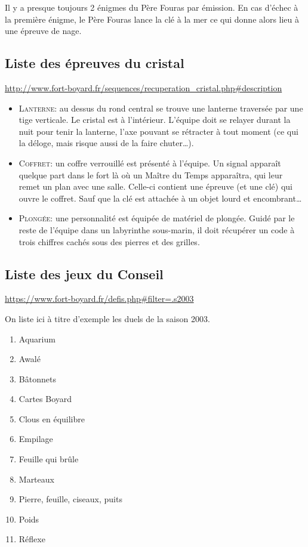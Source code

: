 \documentclass[french,twocolumn,twoside]{article}
\newcommand\bulb{{\faLightbulbO}\xspace}
\newcommand\fist{{\faHandRockO}\xspace}
\newcommand\cristal{{\faDiamond}\xspace}
\begin{document}
Il y a presque toujours 2 énigmes du Père Fouras par émission. En cas d'échec à la première énigme, le Père Fouras lance la clé à la mer ce qui donne alors lieu à une épreuve de nage.

\subsection*{Liste des épreuves du cristal \cristal}

\url{http://www.fort-boyard.fr/sequences/recuperation_cristal.php#description}

\begin{itemize}
	\item \lettrine{L}{anterne}: au dessus du rond central se trouve une lanterne traversée par une tige verticale. Le cristal est à l'intérieur. L'équipe doit se relayer durant la nuit pour tenir la lanterne, l'axe pouvant se rétracter à tout moment (ce qui la déloge, mais risque aussi de la faire chuter\dots).
	\item \lettrine{C}{offret}: un coffre verrouillé est présenté à l'équipe. Un signal apparaît quelque part dans le fort là où un Maître du Temps apparaîtra, qui leur remet un plan avec une salle. Celle-ci contient une épreuve (et une clé) qui ouvre le coffret. Sauf que la clé est attachée à un objet lourd et encombrant\dots
	\item \lettrine{P}{longée}: une personnalité est équipée de matériel de plongée. Guidé par le reste de l'équipe dans un labyrinthe sous-marin, il doit récupérer un code à trois chiffres cachés sous des pierres et des grilles.
\end{itemize}

\subsection*{Liste des jeux du Conseil}
\url{https://www.fort-boyard.fr/defis.php#filter=.s2003}

On liste ici à titre d'exemple les duels de la saison 2003.

\begin{minipage}{0.5\textwidth}
\begin{multicols}{2}
\begin{enumerate}
	\item Aquarium \bulb
	\item Awalé \bulb
	\item Bâtonnets \bulb
	\item Cartes Boyard \bulb
	\item Clous en équilibre \bulb
	\item Empilage \bulb
	\item Feuille qui brûle \bulb
	\item Marteaux \fist
	\item Pierre, feuille, ciseaux, puits \bulb
	\item Poids \fist
	\item Réflexe \fist
\end{enumerate}
\end{multicols}
\end{minipage}
\end{document}
